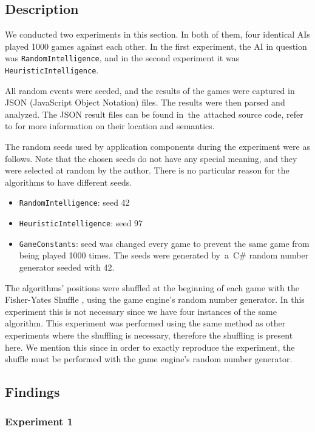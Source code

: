 \subsection{Description}

We conducted two experiments in this section. In both of them, four identical AIs
played 1000 games against each other. In the first experiment, the AI in question was
\texttt{RandomIntelligence}, and in the second
experiment it was \texttt{HeuristicIntelligence}.

All random events were seeded, and the results of the games were captured in JSON
(JavaScript Object Notation) files.
The results were then parsed and analyzed. The JSON result files can be found
in~the~attached source code, refer to  for more information
on their location and semantics.

The random seeds used by application components during the experiment were as follows.
Note that the chosen seeds do not have any special meaning, and they were selected
at random by the author. There is no particular reason for the algorithms to have
different seeds.
\begin{itemize}
    \item \texttt{RandomIntelligence}: seed 42
    \item \texttt{HeuristicIntelligence}: seed 97
    \item \texttt{GameConstants}: seed was changed every game to prevent the same game from
        being played 1000 times. The seeds were generated by~a~C\# 
        random number generator seeded with 42.
\end{itemize}

The algorithms' positions were shuffled at the beginning of each game with
the Fisher-Yates Shuffle \cite{Knuth98}, using the game engine's random
number generator. In this experiment this is not necessary since we have
four instances of the same algorithm. This experiment was performed
using the same method as other experiments where the shuffling is necessary,
therefore the shuffling is present here. We mention this since in order to
exactly reproduce the experiment, the shuffle must be performed with the game engine's
random number generator.

\subsection{Findings}

\subsubsection{Experiment 1}

